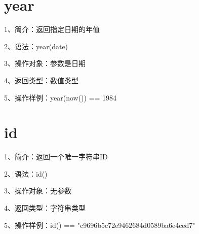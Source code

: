 \section{year}

1、简介：返回指定日期的年值

2、语法：year(date)

3、操作对象：参数是日期

4、返回类型：数值类型

5、操作样例：year(now()) == 1984

\section{id}

1、简介：返回一个唯一字符串ID

2、语法：id()

3、操作对象：无参数

4、返回类型：字符串类型

5、操作样例：id() == "c9696b5c72e9462684d0589ba6e4ced7"

